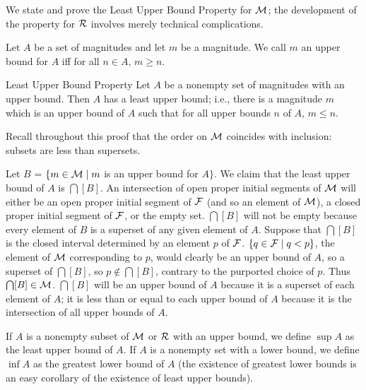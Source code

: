 We state and prove the Least Upper Bound Property for $\cal M$; the
development of the property for $\cal R$ involves merely technical
complications.

\begin{definition}
 Let $A$ be a set of magnitudes and let $m$ be a
 magnitude.  We call $m$ an {\upshape upper bound} for $A$
 iff
 for all $n \in A$, $m \geq n$.
\end{definition}

\begin{Thm}{Least Upper Bound Property}
 Let $A$ be a nonempty set of
 magnitudes with an upper bound.  Then $A$ has a least upper bound;
 i.e., there is a magnitude $m$ which is an upper bound of $A$ such
 that for all upper bounds $n$ of $A$, $m \leq n$.
\end{Thm}

\preuve Recall throughout this proof that the order on
$\cal M$ coincides with inclusion:  subsets are
less than supersets.

Let $B$ = $\{m \in {\cal M} \mid m$ is an upper bound for
$A\}$.  We claim that the least upper bound of $A$ is $\bigcap[B]$.  An
intersection of open proper initial
segments of ${\cal M}$ will either 
be an open proper initial segment of ${\cal F}$ (and so an element of
${\cal M}$), a closed proper initial segment of ${\cal F}$, or the empty
set.  $\bigcap[B]$ will not be empty because every element of
$B$ is a superset of any given element of $A$.  Suppose that $\bigcap[B]$ is
the closed interval determined by an element $p$ of ${\cal F}$.  $\{q
\in {\cal F} \mid q < p\}$, the element of ${\cal M}$ corresponding to
$p$, would clearly be an upper bound of $A$, so a superset
of $\bigcap[B]$, so $p \not\in\bigcap[B]$, contrary to the purported
choice of $p$.  Thus $\bigcap[B]\in {\cal M}$.  $\bigcap[B]$ will be
an upper bound of $A$ because it is a superset of each element of $A$;
it is less than or equal to each upper bound of $A$ because it is the
intersection of all upper bounds of $A$.
\finpreuve

\begin{definition}
 If $A$ is a nonempty subset of ${\cal M}$ or ${\cal
 R}$ with an upper bound, we define $\sup A$ as the least
 upper bound of $A$.  If $A$ is a nonempty set with a
 lower bound, we define $\inf A$ as the greatest lower
 bound of $A$ (the existence of greatest lower
 bounds is an easy corollary of the existence of least upper bounds).
\end{definition}

